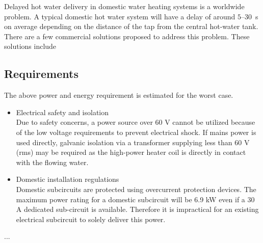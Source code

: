 Delayed hot water delivery in domestic water heating systems is a worldwide problem. A typical domestic hot water system will have a delay of around $5$--$30$~s on average depending on the distance of the tap from the central hot-water tank. 
There are a few commercial solutions proposed to address this problem. These solutions include 

\subsection{Requirements}

The above power and energy requirement is estimated for the worst case.

\begin{itemize}
	
	\item Electrical safety and isolation\\
	Due to safety concerns, a power source over 60 V cannot be utilized because of the low voltage requirements to prevent electrical shock. If mains power is used directly, galvanic isolation via a transformer supplying less than 60 V (rms) may be required as the high-power heater coil is directly in contact with the flowing water\cite{AS/NZSIWH04}.
	
	\item Domestic installation regulations\\
	Domestic subcircuits are protected using overcurrent protection devices\cite{AS/NZSRCD11(c)}. The maximum power rating for a domestic subcircuit will be 6.9 kW even if a 30 A dedicated sub-circuit is available. Therefore it is impractical for an existing electrical subcircuit to solely deliver this power.
	
\end{itemize}



...

